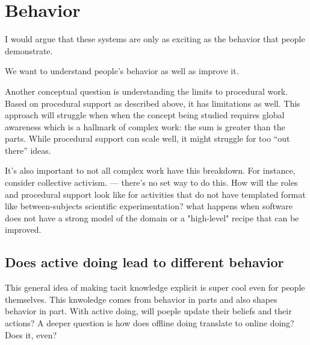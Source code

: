 







\section{Behavior} 

I would argue that these systems are only as exciting as the behavior that people demonstrate. 

We want to understand people's behavior as well as improve it. 

Another conceptual question is understanding the limits to procedural work. Based on procedural support as described above, it has limitations as well. This approach will struggle when when the concept being studied requires global awareness which is a hallmark of complex work: the sum is greater than the parts.  While procedural support can scale well, it might struggle for too “out there” ideas.

It's also important to not all complex work have this breakdown. For instance, consider collective activism. — there’s no set way to do this. How will the roles and procedural support look like for activities that do not have templated format like between-subjects scientific experimentation?  what happens when software does not have a strong model of the domain or a "high-level" recipe that can be improved.


\subsection{Does active doing lead to different behavior}
This general idea of making tacit knowledge explicit is super cool even for people themselves. This knwoledge comes from behavior in parts and also shapes behavior in part. With active doing, will poeple update their beliefs and their actions? A deeper question is how does offline doing translate to online doing? Does it, even?

